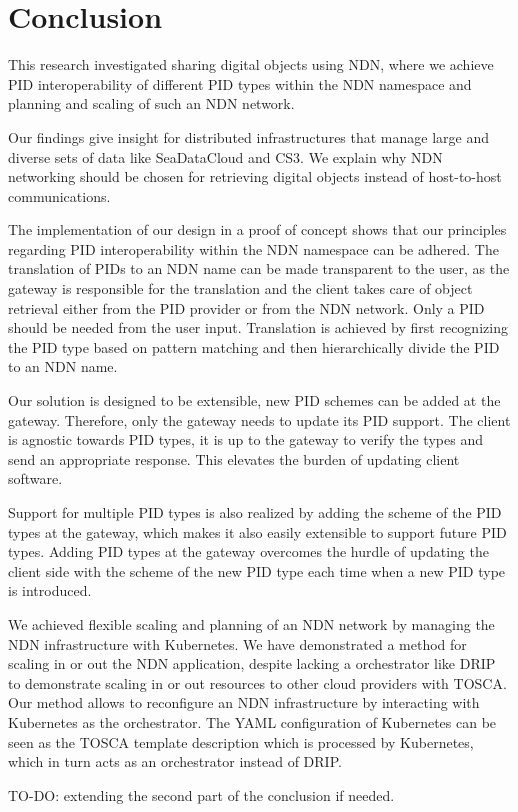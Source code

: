 \section{Conclusion}\label{conc}
This research investigated sharing digital objects using NDN, where we achieve PID interoperability of different PID types within the NDN namespace and planning and scaling of such an NDN network. 

Our findings give insight for distributed infrastructures that manage large and diverse sets of data like SeaDataCloud and CS3. We explain why NDN networking should be chosen for retrieving digital objects instead of host-to-host communications.

The implementation of our design in a proof of concept shows that our principles regarding PID interoperability within the NDN namespace can be adhered. The translation of PIDs to an NDN name can be made transparent to the user, as the gateway is responsible for the translation and the client takes care of object retrieval either from the PID provider or from the NDN network. Only a PID should be needed from the user input. Translation is achieved by first recognizing the PID type based on pattern matching and then hierarchically divide the PID to an NDN name. 

Our solution is designed to be extensible, new PID schemes can be added at the gateway. Therefore, only the gateway needs to update its PID support. The client is agnostic towards PID types, 
it is up to the gateway to verify the types 
and send an appropriate response. This elevates the burden of updating client software.

Support for multiple PID types is also realized by adding the scheme of the PID types at the gateway, which makes it also easily extensible to support future PID types. Adding PID types at the gateway overcomes the hurdle of updating the client side with the scheme of the new PID type each time when a new PID type is introduced.

We achieved flexible scaling and planning of an NDN network by managing the NDN infrastructure with Kubernetes. We have demonstrated a method for scaling in or out the NDN application, despite lacking a orchestrator like DRIP to demonstrate scaling in or out resources to other cloud providers with TOSCA. Our method allows to reconfigure an NDN infrastructure 
by interacting with Kubernetes as the orchestrator. The YAML configuration of Kubernetes can be seen as the TOSCA template description which is processed by Kubernetes, which in turn acts as an orchestrator instead of DRIP.

TO-DO: extending the second part of the conclusion if needed.
